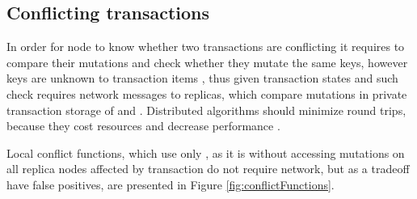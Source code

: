 
\subsection{Conflicting transactions}\label{sec:impl:conflictFunctions}
In order for node  to know whether two transactions are conflicting it requires to compare their mutations and check whether they mutate the same keys, however keys are unknown to transaction items \txItems, thus
given transaction states \txStateOne and \txStateTwo such check requires network messages to replicas, which compare mutations in private transaction storage of \txStateOne and \txStateTwo. 
Distributed algorithms should minimize round trips, because they cost resources and decrease performance \cite{rotem2006fallacies}.

Local conflict functions, which use only \txState, as it is without accessing mutations \mutations on all replica nodes affected by transaction \nodesTx do not require network, but as a tradeoff have false positives, are presented in Figure \ref{fig:conflictFunctions}. 



